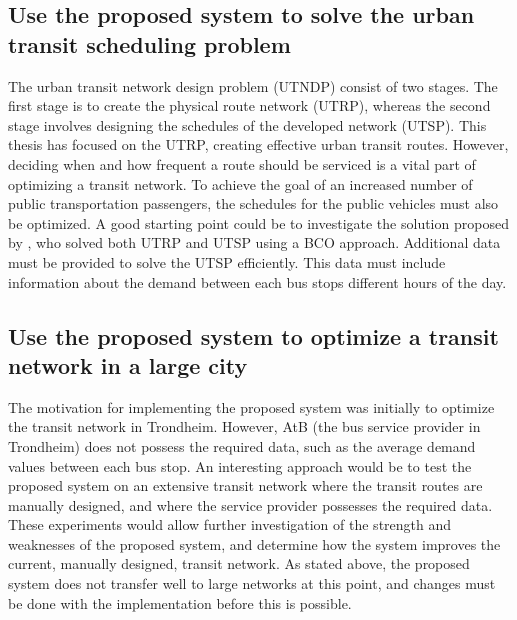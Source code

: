 \subsection*{Use the proposed system to solve the urban transit scheduling problem}
The urban transit network design problem (UTNDP)  consist of two stages. The first stage is to create the physical route network (UTRP), whereas the second stage involves designing the schedules of the developed network (UTSP). This thesis has focused on the UTRP, creating effective urban transit routes. However, deciding when and how frequent a route should be serviced is a vital part of optimizing a transit network. To achieve the goal of an increased number of public transportation passengers, the schedules for the public vehicles must also be optimized. A good starting point could be to investigate the solution proposed by \citet{nikolic14}, who solved both UTRP and UTSP using a BCO approach. Additional data must be provided to solve the UTSP efficiently. This data must include information about the demand between each bus stops different hours of the day.  

\subsection*{Use the proposed system to optimize a transit network in a large city}
The motivation for implementing the proposed system was initially to optimize the transit network in Trondheim. However, AtB (the bus service provider in Trondheim) does not possess the required data, such as the average demand values between each bus stop. An interesting approach would be to test the proposed system on an extensive transit network where the transit routes are manually designed, and where the service provider possesses the required data. These experiments would allow further investigation of the strength and weaknesses of the proposed system, and determine how the system improves the current, manually designed, transit network. As stated above, the proposed system does not transfer well to large networks at this point, and changes must be done with the implementation before this is possible. 



